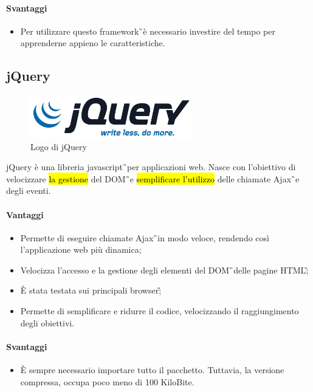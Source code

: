 \paragraph{Svantaggi}
	\begin{itemize}
		\item Per utilizzare questo \gls{framework}\G\ è necessario investire del tempo per apprenderne appieno le caratteristiche.
	\end{itemize}
\subsection{jQuery}
	\begin{figure}[H]
		\begin{center}
			\includegraphics[width=7cm]{Pics/jquery_logo.png}
			\caption{Logo di jQuery}
			\label{fig:jQueryLogo}
		\end{center}
	\end{figure}
	jQuery è una libreria \gls{javascript}\G\ per applicazioni web. Nasce con l'obiettivo di velocizzare \hl{la gestione} del \gls{DOM}\G\  e \hl{semplificare l'utilizzo} delle chiamate \gls{Ajax}\G\ e degli eventi.
\paragraph{Vantaggi}
	\begin{itemize}
		\item Permette di eseguire chiamate \gls{Ajax}\G\ in modo veloce, rendendo così l'applicazione web più dinamica;
		\item Velocizza l'accesso e la gestione degli elementi del \gls{DOM}\G\ delle pagine \gls{HTML}\G;
		\item È stata testata sui principali \gls{browser}\G;
		\item Permette di semplificare e ridurre il codice, velocizzando il raggiungimento degli obiettivi. 
	\end{itemize}
\paragraph{Svantaggi}
	\begin{itemize}
		\item È sempre necessario importare tutto il pacchetto. Tuttavia, la versione compressa, occupa poco meno di 100 KiloBite. 
\end{itemize}